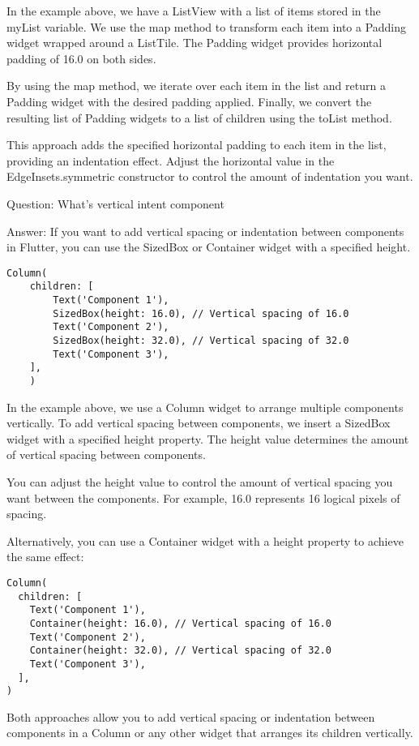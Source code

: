 In the example above, we have a ListView with a list of items stored in the myList variable. We use the map 
method to transform each item into a Padding widget wrapped around a ListTile. The Padding widget provides 
horizontal padding of 16.0 on both sides.

By using the map method, we iterate over each item in the list and return a Padding widget with the desired 
padding applied. Finally, we convert the resulting list of Padding widgets to a list of children using the 
toList method.

This approach adds the specified horizontal padding to each item in the list, providing an indentation effect. 
Adjust the horizontal value in the EdgeInsets.symmetric constructor to control the amount of indentation you want.


Question: What's vertical intent component

Answer: If you want to add vertical spacing or indentation between components in Flutter, you can use the 
SizedBox or Container widget with a specified height. 

\begin{lstlisting}
Column(
    children: [
        Text('Component 1'),
        SizedBox(height: 16.0), // Vertical spacing of 16.0
        Text('Component 2'),
        SizedBox(height: 32.0), // Vertical spacing of 32.0
        Text('Component 3'),
    ],
    ) 
\end{lstlisting}

In the example above, we use a Column widget to arrange multiple components vertically. To add vertical spacing 
between components, we insert a SizedBox widget with a specified height property. The height value determines 
the amount of vertical spacing between components.

You can adjust the height value to control the amount of vertical spacing you want between the components. 
For example, 16.0 represents 16 logical pixels of spacing.

Alternatively, you can use a Container widget with a height property to achieve the same effect:

\begin{lstlisting}
Column(
  children: [
    Text('Component 1'),
    Container(height: 16.0), // Vertical spacing of 16.0
    Text('Component 2'),
    Container(height: 32.0), // Vertical spacing of 32.0
    Text('Component 3'),
  ],
)
\end{lstlisting}

Both approaches allow you to add vertical spacing or indentation between components in a Column or any other 
widget that arranges its children vertically.


